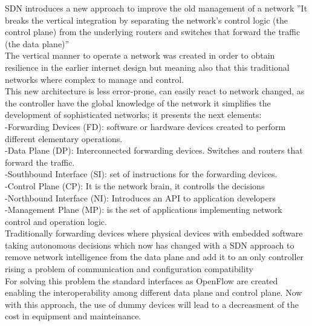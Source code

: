 SDN introduces a new approach to improve the old management of a network ”It breaks the vertical integration by separating the network’s control logic (the control plane) from the underlying routers and switches that forward the traffic (the data plane)”\cite{1}\\
 
The vertical manner to operate a network was created in order to obtain resilience in the earlier internet design but meaning also that this traditional networks where complex to manage and control.\\
 
This new architecture is less error-prone, can easily react to network changed, as the controller have the global knowledge of the network it simplifies the
development of sophisticated networks; it presents the next elements:\\
 
-Forwarding Devices (FD): software or hardware devices created to perform different elementary operations.\\
 
-Data Plane (DP): Interconnected forwarding devices. Switches and routers that forward the traffic.\\

-Southbound Interface (SI): set of instructions for the forwarding devices.\\
 
-Control Plane (CP): It is the network brain, it controlls the decisions\\
 
-Northbound Interface (NI): Introduces an API to application developers\\
 
-Management Plane (MP): is the set of applications implementing network control and operation logic.\\

Traditionally forwarding devices where physical devices with embedded software taking autonomous decisions which now has changed with a SDN approach to remove network intelligence from the data plane and add it to an only controller rising a problem of communication and configuration compatibility\\

For solving this problem the standard interfaces as OpenFlow are created enabling the interoperability among different data plane and control plane. Now with this approach, the use of dummy devices will lead to a decreasment of  the cost in equipment and mainteinance.\\
 
